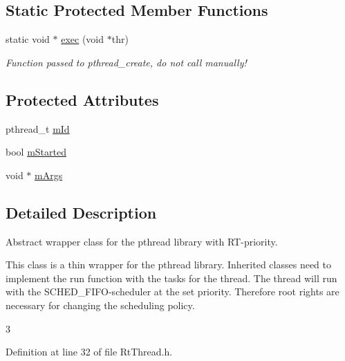 \subsection*{\-Static \-Protected \-Member \-Functions}
\begin{DoxyCompactItemize}
\item 
static void $\ast$ \hyperlink{class_u_s_u_1_1_rt_thread_ab971fca9b0e83f4101ca9c1723af4bdc}{exec} (void $\ast$thr)
\begin{DoxyCompactList}\small\item\em \-Function passed to pthread\-\_\-create, do not call manually! \end{DoxyCompactList}\end{DoxyCompactItemize}
\subsection*{\-Protected \-Attributes}
\begin{DoxyCompactItemize}
\item 
pthread\-\_\-t \hyperlink{class_u_s_u_1_1_rt_thread_afe45711f791a727426c6b0e23add03a8}{m\-Id}
\item 
bool \hyperlink{class_u_s_u_1_1_rt_thread_a990cc76b2f9541a6dbafdfa6be5fd367}{m\-Started}
\item 
void $\ast$ \hyperlink{class_u_s_u_1_1_rt_thread_a5213699b8def7e9e2af0add4648b8b40}{m\-Args}
\end{DoxyCompactItemize}


\subsection{\-Detailed \-Description}
\-Abstract wrapper class for the pthread library with \-R\-T-\/priority. 

\-This class is a thin wrapper for the pthread library. \-Inherited classes need to implement the run function with the tasks for the thread. \-The thread will run with the \-S\-C\-H\-E\-D\-\_\-\-F\-I\-F\-O-\/scheduler at the set priority. \-Therefore root rights are necessary for changing the scheduling policy.

3 

\-Definition at line 32 of file \-Rt\-Thread.\-h.



